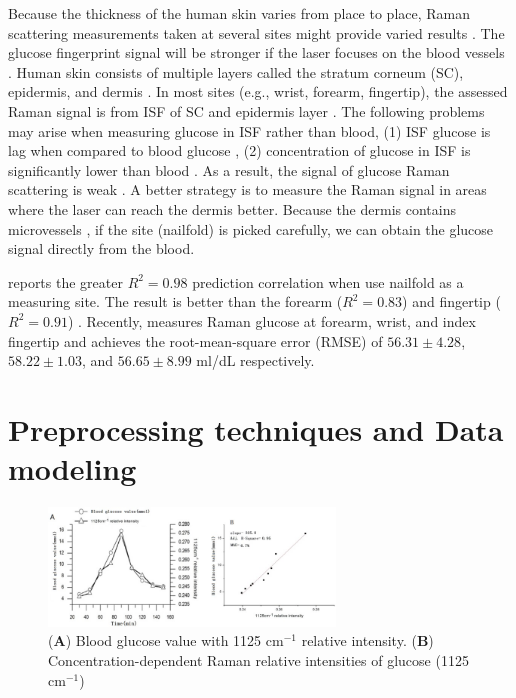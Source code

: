 Because the thickness of the human skin varies from place to place, Raman scattering measurements taken at several sites might provide varied results \citep{ramanNailFold2019, sitecompare}.
The glucose fingerprint signal will be stronger if the laser focuses on the blood vessels \citep{solutionGlucose}.
Human skin consists of multiple layers called the stratum corneum (SC), epidermis, and dermis \citep{ramanNailFold2019}.
In most sites (e.g., wrist, forearm, fingertip), the assessed Raman signal is from ISF of SC and epidermis layer \citep{ramanNailFold2019}.
The following problems may arise when measuring glucose in ISF rather than blood, 
(1) ISF glucose is lag when compared to blood glucose \citep{bloodvsisf, isflag}, 
(2) concentration of glucose in ISF is significantly lower than blood \citep{isfconcentration}. 
As a result, the signal of glucose Raman scattering is weak \citep{ramanNailFold2019}.
A better strategy is to measure the Raman signal in areas where the laser can reach the dermis better.
Because the dermis contains microvessels \citep{microvessel-dermis, microvessel-dermis2}, if the site (nailfold) is picked carefully, we can obtain the glucose signal directly from the blood.

\cite{ramanNailFold2019} reports the greater $R^2 = 0.98$ prediction correlation when use nailfold as a measuring site.
The result is better than the forearm ($R^2 = 0.83$) \citep{forearm2005,forearm2014} and fingertip ($R^2 = 0.91$) \citep{fingertip2011}.
Recently, \cite{sitecompare} measures Raman glucose at forearm, wrist, and index fingertip and achieves the root-mean-square error (RMSE) of $56.31\pm4.28$, $58.22\pm1.03$, and $56.65\pm8.99$ ml/dL respectively.

\section{Preprocessing techniques and Data modeling}

\begin{figure}
    \caption{(\textbf{A}) Blood glucose value with 1125 $\text{cm}^{-1}$ relative intensity. (\textbf{B}) Concentration-dependent Raman relative intensities of glucose (1125 $\text{cm}^{-1}$) \citep{solutionGlucose}}
    \centerline{\includegraphics[width=3in]{figures/bloodGlucose-relative1125.png}}\label{fig:bloodGlucose-relative1125}
\end{figure}

